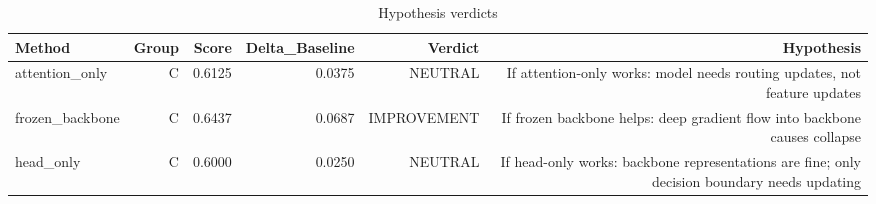 \begin{table}[htbp]
\centering
\caption{Hypothesis verdicts}
\label{tab:hyp-verdicts}
\begin{tabular}{lrrrrr}
\toprule
\textbf{Method} & \textbf{Group} & \textbf{Score} & \textbf{Delta\_Baseline} & \textbf{Verdict} & \textbf{Hypothesis} \\
\midrule
attention\_only & C & 0.6125 & 0.0375 & NEUTRAL & If attention-only works: model needs routing updates, not feature updates \\
frozen\_backbone & C & 0.6437 & 0.0687 & IMPROVEMENT & If frozen backbone helps: deep gradient flow into backbone causes collapse \\
head\_only & C & 0.6000 & 0.0250 & NEUTRAL & If head-only works: backbone representations are fine; only decision boundary needs updating \\
\bottomrule
\end{tabular}
\end{table}
